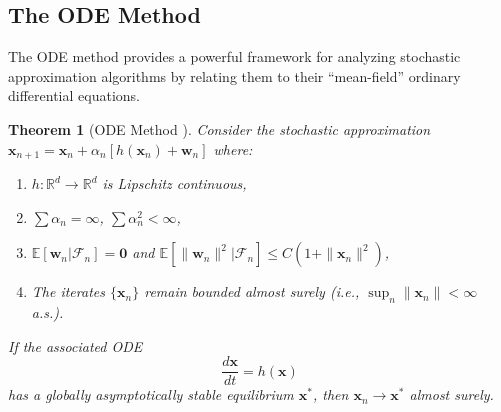 \documentclass[11pt,a4paper]{article}
\theoremstyle{definition}
\theoremstyle{plain}
\newtheorem{theorem}{Theorem}[section]
\theoremstyle{remark}
\newcommand{\E}{\mathbb{E}}
\newcommand{\R}{\mathbb{R}}
\begin{document}
\subsection{The ODE Method}
\label{app:ode_method}

The ODE method provides a powerful framework for analyzing stochastic approximation algorithms by relating them to their ``mean-field'' ordinary differential equations.

\begin{theorem}[ODE Method {\cite{borkar2000}}]
\label{thm:ode_method}
Consider the stochastic approximation $\bm{x}_{n+1} = \bm{x}_n + \alpha_n[h(\bm{x}_n) + \bm{w}_n]$ where:
\begin{enumerate}[nosep]
    \item $h: \R^d \to \R^d$ is Lipschitz continuous,
    \item $\sum \alpha_n = \infty$, $\sum \alpha_n^2 < \infty$,
    \item $\E[\bm{w}_n | \mathcal{F}_n] = \bm{0}$ and $\E[\|\bm{w}_n\|^2 | \mathcal{F}_n] \leq C(1 + \|\bm{x}_n\|^2)$,
    \item The iterates $\{\bm{x}_n\}$ remain bounded almost surely (i.e., $\sup_n \|\bm{x}_n\| < \infty$ a.s.).
\end{enumerate}
If the associated ODE
\begin{equation}
    \frac{d\bm{x}}{dt} = h(\bm{x})
    \label{eq:ode}
\end{equation}
has a globally asymptotically stable equilibrium $\bm{x}^*$, then $\bm{x}_n \to \bm{x}^*$ almost surely.
\end{theorem}
\end{document}

